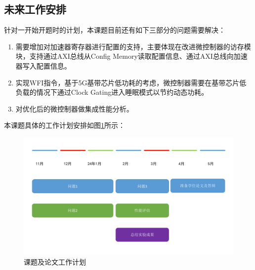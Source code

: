 \documentclass[a4paper, 12pt]{article}
\begin{document}
\subsection{未来工作安排}

针对一开始开题时的计划，本课题目前还有如下三部分的问题需要解决：
\begin{enumerate}
  \item 需要增加对加速器寄存器进行配置的支持，主要体现在改进微控制器的访存模块，支持通过AXI总线从Config Memory读取配置信息、通过AXI总线向加速器写入配置信息。
  \item 实现WFI指令，基于5G基带芯片低功耗的考虑，微控制器需要在基带芯片低负载的情况下通过Clock Gating进入睡眠模式以节约动态功耗。
  \item 对优化后的微控制器做集成性能分析。
\end{enumerate}

本课题具体的工作计划安排如图\ref{fig:job_plan}所示：
\begin{figure}[htbp]
  \centering
  \includegraphics[width=\linewidth]{./images/job_plan.pdf}
  \caption{课题及论文工作计划}
  \label{fig:job_plan}
\end{figure}
  
  

\end{document}
